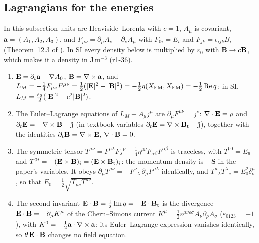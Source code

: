 \subsection{Lagrangians for the energies}
\label{r1:sec:energies}

In this subsection units are Heaviside--Lorentz with $c=1$, $A_\mu$ is covariant, $\mathbf a=(A_1,A_2,A_3)$, and
$F_{\mu\nu}=\partial_\mu A_\nu-\partial_\nu A_\mu$ with $F_{0i}=E_i$ and $F_{jk}=\epsilon_{ijk}B_i$ (Theorem~12.3 of \cite{ES17}). In SI
every density below is multiplied by $\varepsilon_0$ with $\mathbf B\to c\mathbf B$, which makes it a density in $\mathrm{J\,m^{-3}}$ (r1-36).

\begin{proposition}
\label{r1:prop:maxwell}
\begin{enumerate}[label=(\roman*),leftmargin=2.2em]
\item $\mathbf E=\partial_t\mathbf a-\nabla A_0$, $\mathbf B=\nabla\times\mathbf a$, and
$L_M=-\tfrac14F_{\mu\nu}F^{\mu\nu}=\tfrac12(|\mathbf E|^2-|\mathbf B|^2)=-\tfrac12\eta(X_{\rm EM},X_{\rm EM})=-\tfrac12\operatorname{Re} q$; in SI,
$L_M=\tfrac{\varepsilon_0}2(|\mathbf E|^2-c^2|\mathbf B|^2)$.
\item The Euler--Lagrange equations of $L_M-A_\mu j^\mu$ are $\partial_\mu F^{\mu\nu}=j^\nu$: $\nabla\cdot\mathbf E=\rho$ and
$\partial_t\mathbf E=-\nabla\times\mathbf B-\mathbf j$ (in textbook variables $\partial_t\mathbf E=\nabla\times\mathbf B_{\rm t}-\mathbf j$), together with the identities $\partial_t\mathbf B=\nabla\times\mathbf E$,
$\nabla\cdot\mathbf B=0$.
\item The symmetric tensor $T^{\mu\nu}=F^{\mu\lambda}F_\lambda{}^\nu+\tfrac14\eta^{\mu\nu}F_{\alpha\beta}F^{\alpha\beta}$ is traceless, with
$T^{00}=E_6$ and $T^{0i}=-(\mathbf E\times\mathbf B)_i=(\mathbf E\times\mathbf B_{\rm t})_i$: the momentum density is $-\mathbf S$ in the paper's variables. It obeys
$\partial_\mu T^{\mu\nu}=-F^\nu{}_\lambda\,\partial_\mu F^{\mu\lambda}$ identically, and $T^\mu{}_\lambda T^\lambda{}_\nu=E_0^2\delta^\mu_\nu$,
so that $E_0=\tfrac12\sqrt{T_{\mu\nu}T^{\mu\nu}}$.
\item The second invariant $\mathbf E\cdot\mathbf B=\tfrac12\operatorname{Im} q=-\mathbf E\cdot\mathbf B_{\rm t}$ is the divergence $\mathbf E\cdot\mathbf B=-\partial_\mu K^\mu$ of the
Chern--Simons current $K^\mu=\tfrac12\varepsilon^{\mu\nu\rho\sigma}A_\nu\partial_\rho A_\sigma$ ($\varepsilon_{0123}=+1$), with
$K^0=-\tfrac12\mathbf a\cdot\nabla\times\mathbf a$; its Euler--Lagrange expression vanishes identically, so $\theta\,\mathbf E\cdot\mathbf B$ changes no field
equation.
\end{enumerate}
\end{proposition}

